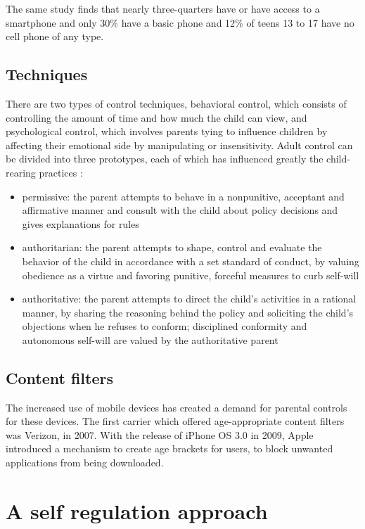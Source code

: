 The same study finds that nearly three-quarters have or have access to a smartphone and only 30\% have a basic phone and 12\% of teens 13 to 17 have no cell phone of any type.

\subsection{Techniques}

There are two types of control techniques, behavioral control, which consists of controlling the amount of time and how much the child can view, and psychological control, which involves parents tying to influence children by affecting their emotional side by manipulating or insensitivity. Adult control can be divided into three prototypes, each of which has influenced greatly the child-rearing practices \parencite{baumrind1966effects}:

\begin{itemize}
\item permissive: the parent attempts to behave in a nonpunitive, acceptant and affirmative manner and consult with the child about policy decisions and gives explanations for rules
\item authoritarian: the parent attempts to shape, control and evaluate the behavior of the child in accordance with a set standard of conduct, by valuing obedience as a virtue and favoring punitive, forceful measures to curb self-will
\item authoritative: the parent attempts to direct the child's activities in a rational manner, by sharing the reasoning behind the policy and soliciting the child's objections when he refuses to conform; disciplined conformity and autonomous self-will are valued by the authoritative parent
\end{itemize}

\subsection{Content filters}

The increased use of mobile devices has created a demand for parental controls for these devices. The first carrier which offered age-appropriate content filters was Verizon, in 2007. With the release of iPhone OS 3.0 in 2009, Apple introduced a mechanism to create age brackets for users, to block unwanted applications from being downloaded.


\section{A self regulation approach}

